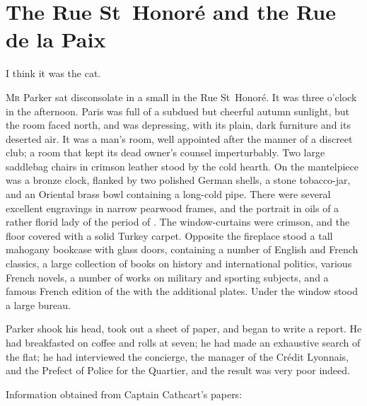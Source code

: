 \chapter{The Rue St~Honoré and the Rue de la Paix}

\epigraph{I think it was the cat.}{}

\lettrine{M}{r} Parker sat disconsolate in a small  in the Rue St~Honoré. It was three o'clock in the afternoon. Paris was full of a subdued but cheerful autumn sunlight, but the room faced north, and was depressing, with its plain, dark furniture and its deserted air.  It was a man's room, well appointed after the manner of a discreet club; a room that kept its dead owner's counsel imperturbably. Two large saddlebag chairs in crimson leather stood by the cold hearth.  On the mantelpiece was a bronze clock, flanked by two polished German shells, a stone tobacco-jar, and an Oriental brass bowl containing a long-cold pipe. There were several excellent engravings in narrow pearwood frames, and the portrait in oils of a rather florid lady of the period of . The window-curtains were crimson, and the floor covered with a solid Turkey carpet. Opposite the fireplace stood a tall mahogany bookcase with glass doors, containing a number of English and French classics, a large collection of books on history and international politics, various French novels, a number of works on military and sporting subjects, and a famous French edition of the  with the additional plates. Under the window stood a large bureau.

Parker shook his head, took out a sheet of paper, and began to write a report. He had breakfasted on coffee and rolls at seven; he had made an exhaustive search of the flat; he had interviewed the concierge, the manager of the Crédit Lyonnais, and the Prefect of Police for the Quartier, and the result was very poor indeed.

Information obtained from Captain Cathcart's papers:


